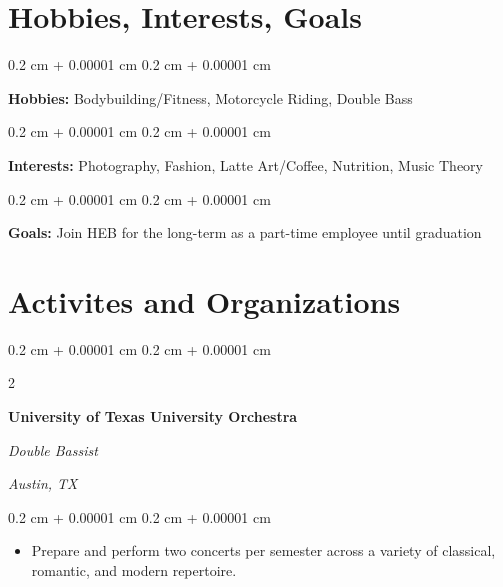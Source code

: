 \documentclass[10pt, letterpaper]{article}
\newenvironment{highlights}{
    \begin{itemize}[
        topsep=0.10 cm,
        parsep=0.10 cm,
        partopsep=0pt,
        itemsep=0pt,
        leftmargin=0.4 cm + 10pt
    ]
}{
    \end{itemize}
} %
\newenvironment{onecolentry}{
    \begin{adjustwidth}{
        0.2 cm + 0.00001 cm
    }{
        0.2 cm + 0.00001 cm
    }
}{
    \end{adjustwidth}
} %
\newenvironment{twocolentry}[2][]{
    \onecolentry
    \def\secondColumn{#2}
    \setcolumnwidth{\fill, 4.5 cm}
    \begin{paracol}{2}
}{
    \switchcolumn \raggedleft \secondColumn
    \end{paracol}
    \endonecolentry
} %
\begin{document}
    
    \section{Hobbies, Interests, Goals}



        
        \begin{onecolentry}
            \textbf{Hobbies:} Bodybuilding/Fitness, Motorcycle Riding, Double Bass
        \end{onecolentry}

        \vspace{0.2 cm}

        \begin{onecolentry}
            \textbf{Interests:} Photography, Fashion, Latte Art/Coffee, Nutrition, Music Theory
        \end{onecolentry}

        \vspace{0.2 cm}

        \begin{onecolentry}
            \textbf{Goals:} Join HEB for the long-term as a part-time employee until graduation
        \end{onecolentry}


    
    \section{Activites and Organizations}



        
        \begin{twocolentry}{
        \textit{Austin, TX}    
            
        }
            \textbf{University of Texas University Orchestra}
            
            \textit{Double Bassist}
        \end{twocolentry}

        \vspace{0.10 cm}
        \begin{onecolentry}
            \begin{highlights}
                \item Prepare and perform two concerts per semester across a variety of classical, romantic, and modern repertoire.
            \end{highlights}
        \end{onecolentry}



    
\end{document}
